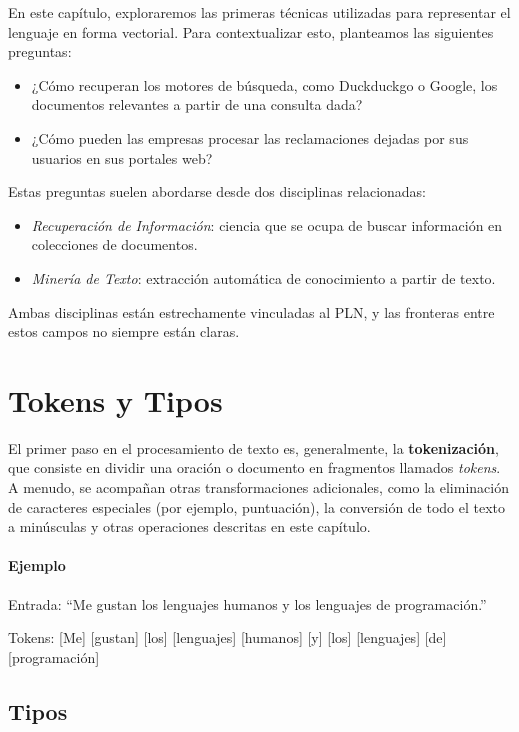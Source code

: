 
En este capítulo, exploraremos las primeras técnicas utilizadas para representar el lenguaje en forma vectorial. Para contextualizar esto, planteamos las siguientes preguntas:

\begin{itemize}
   \item ¿Cómo recuperan los motores de búsqueda, como Duckduckgo o Google, los documentos relevantes a partir de una consulta dada?
   \item ¿Cómo pueden las empresas procesar las reclamaciones dejadas por sus usuarios en sus portales web?
\end{itemize}

Estas preguntas suelen abordarse desde dos disciplinas relacionadas:

\begin{itemize}
   \item \emph{Recuperación de Información}: ciencia que se ocupa de buscar información en colecciones de documentos.
   \item \emph{Minería de Texto}: extracción automática de conocimiento a partir de texto.
\end{itemize}

Ambas disciplinas están estrechamente vinculadas al PLN, y las fronteras entre estos campos no siempre están claras.

\section{Tokens y Tipos}

El primer paso en el procesamiento de texto es, generalmente, la \textbf{tokenización}, que consiste en dividir una oración o documento en fragmentos llamados \emph{tokens}. A menudo, se acompañan otras transformaciones adicionales, como la eliminación de caracteres especiales (por ejemplo, puntuación), la conversión de todo el texto a minúsculas y otras operaciones descritas en este capítulo.

\paragraph{Ejemplo}

Entrada: ``Me gustan los lenguajes humanos y los lenguajes de programación.''

Tokens: [Me] [gustan] [los] [lenguajes] [humanos] [y] [los] [lenguajes] [de] [programación]

\subsection{Tipos}

